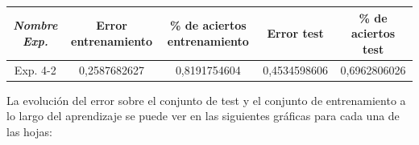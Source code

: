 \documentclass{uc3mpracticas}
\begin{document}
\begin{center}
  \begin{tabular}{|c|c|c|c|c|}
    \hline
        \textit{\textbf{Nombre Exp.}}     & \textbf{Error entrenamiento} & \textbf{\% de aciertos entrenamiento} & \textbf{Error test} & \textbf{\% de aciertos test}\\ \hline
        Exp. 4-2         &  0,2587682627       &  0,8191754604                &  0,4534598606   &  0,6962806026     \\ \hline
  \end{tabular}
\end{center}

La evolución del error sobre el conjunto de test y el conjunto de entrenamiento a lo largo del aprendizaje se puede ver en las siguientes gráficas para cada una de las hojas:
\end{document}
